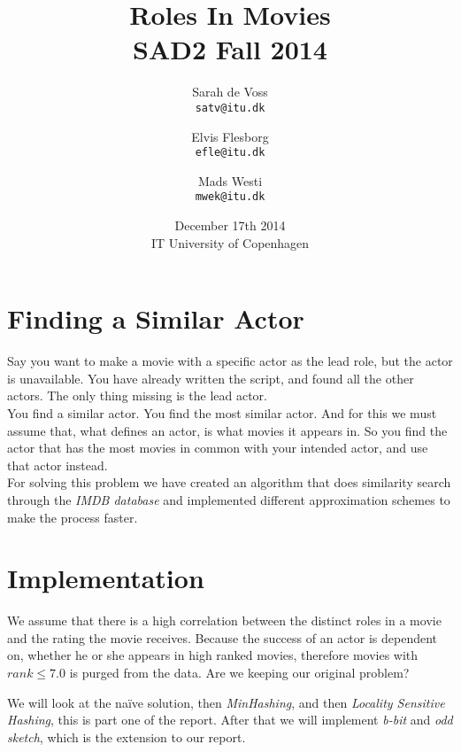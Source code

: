 \documentclass[a4paper,11pt]{article}
\begin{document}
\setlength{\parindent}{0cm}
\setlength{\unitlength}{1mm}
\date{December 17th 2014\\ IT University of Copenhagen}
\title{Roles In Movies\\SAD2 Fall 2014}

\author{Sarah de Voss\\
\texttt{satv@itu.dk}
\and Elvis Flesborg\\
\texttt{efle@itu.dk}
\and Mads Westi\\
\texttt{mwek@itu.dk}}
\clearpage\maketitle

\thispagestyle{empty}
\newpage
\tableofcontents
\thispagestyle{empty}
\newpage

\setcounter{page}{1}
\section{Finding a Similar Actor}

Say you want to make a movie with a specific actor as the lead role, but the actor is unavailable. You have already written the script, and found all the other actors. The only thing missing is the lead actor. \\

You find a similar actor. You find the most similar actor. And for this we must assume that, what defines an actor, is what movies it appears in. So you find the actor that has the most movies in common with your intended actor, and use that actor instead. \\

For solving this problem we have created an algorithm that does similarity search through the \emph{IMDB database} and implemented different approximation schemes to make the process faster.


\section{Implementation}
\begin{mdframed}[hidealllines=true,backgroundcolor=blue!20]
We assume that there is a high correlation between the distinct roles in a movie and the rating the movie receives. Because the success of an actor is dependent on, whether he or she appears in high ranked movies, therefore movies with $rank \leq 7.0$ is purged from the data. Are we keeping our original problem?
\end{mdframed}
We will look at the naïve solution, then \emph{MinHashing}, and then \emph{Locality Sensitive Hashing}, this is part one of the report. After that we will implement \emph{b-bit} and \emph{odd sketch}, which is the extension to our report.
\end{document}
